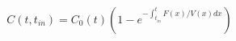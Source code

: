 \begin{equation}
C(t,t_{in}) = C_0(t)\left(1-e^{-\int_{t_{in}}^t F(x)/V(x) dx} \right)
\end{equation}